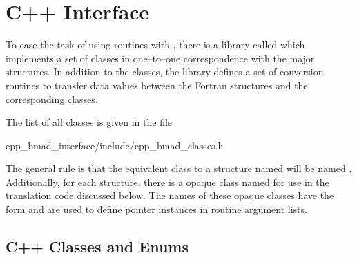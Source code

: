 \chapter{C++ Interface}
\label{c:cpp.interface}

To ease the task of using \cpp routines with \bmad, there is a
library called  which implements a set of \cpp
classes in one--to--one correspondence with the major \bmad
structures. In addition to the \cpp classes, the \bmad library
defines a set of conversion routines to transfer data values between
the \bmad Fortran structures and the corresponding \cpp classes.

The list of all classes is given in the file
\begin{example}
  cpp_bmad_interface/include/cpp_bmad_classes.h
\end{example}
The general rule is that the equivalent class to a \bmad structure
named  will be named . Additionally, for
each \bmad structure, there is a opaque class named 
for use in the translation code discussed below. The names of these
opaque classes have the form  and are used to define
pointer instances in routine argument lists.

\section{C++ Classes and Enums}

